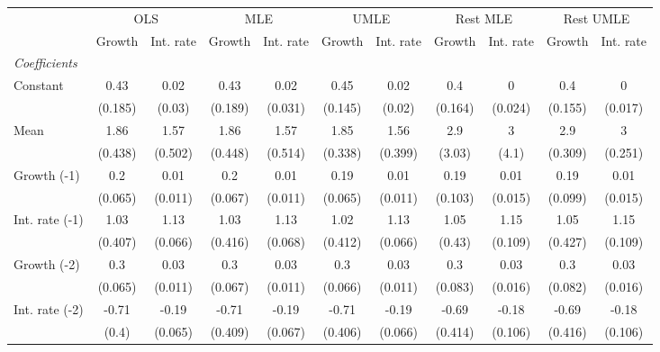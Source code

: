 \begin{table}[htbp] 
	\centering 
	\begin{tabular}{@{\extracolsep{4pt}}lcccccccccc@{}}		\hline\hline
		 		 & \multicolumn{2}{c}{OLS} &\multicolumn{2}{c}{MLE} &\multicolumn{2}{c}{UMLE} &\multicolumn{2}{c}{Rest MLE} &\multicolumn{2}{c}{Rest UMLE} \\ 
 		 & Growth 	 & Int. rate 	 & Growth 	 & Int. rate 	 & Growth 	 & Int. rate 	 & Growth 	 & Int. rate 	 & Growth 	 & Int. rate\\\cline{2-3}\cline{4-5}\cline{6-7}\cline{8-9}\cline{10-11}
\rule{0pt}{4ex} 
 \emph{Coefficients} 	  		 & 		 & 		 & 		 & 		 & 		 & 		 & 		 & 		 & 		 &\\ 
\quad Constant 	 & 0.43 	 & 0.02 	 & 0.43 	 & 0.02 	 & 0.45 	 & 0.02 	 & 0.4 	 & 0 	 & 0.4 	 & 0	 \\ 
 		 & (0.185) 	 & (0.03) 	 & (0.189) 	 & (0.031) 	 & (0.145) 	 & (0.02) 	 & (0.164) 	 & (0.024) 	 & (0.155) 	 & (0.017) 	 \\ 
\quad Mean 	 & 1.86 	 & 1.57 	 & 1.86 	 & 1.57 	 & 1.85 	 & 1.56 	 & 2.9 	 & 3 	 & 2.9 	 & 3	 \\ 
 		 & (0.438) 	 & (0.502) 	 & (0.448) 	 & (0.514) 	 & (0.338) 	 & (0.399) 	 & (3.03) 	 & (4.1) 	 & (0.309) 	 & (0.251) 	 \\ 
\quad Growth (-1) 	 &0.2 	 & 0.01 	 & 0.2 	 & 0.01 	 & 0.19 	 & 0.01 	 & 0.19 	 & 0.01 	 & 0.19 	 & 0.01	 \\ 
 		 & (0.065) 	 & (0.011) 	 & (0.067) 	 & (0.011) 	 & (0.065) 	 & (0.011) 	 & (0.103) 	 & (0.015) 	 & (0.099) 	 & (0.015) 	 \\ 
\quad Int. rate (-1) 	 &1.03 	 & 1.13 	 & 1.03 	 & 1.13 	 & 1.02 	 & 1.13 	 & 1.05 	 & 1.15 	 & 1.05 	 & 1.15	 \\ 
 		 & (0.407) 	 & (0.066) 	 & (0.416) 	 & (0.068) 	 & (0.412) 	 & (0.066) 	 & (0.43) 	 & (0.109) 	 & (0.427) 	 & (0.109) 	 \\ 
\quad Growth (-2) 	 &0.3 	 & 0.03 	 & 0.3 	 & 0.03 	 & 0.3 	 & 0.03 	 & 0.3 	 & 0.03 	 & 0.3 	 & 0.03	 \\ 
 		 & (0.065) 	 & (0.011) 	 & (0.067) 	 & (0.011) 	 & (0.066) 	 & (0.011) 	 & (0.083) 	 & (0.016) 	 & (0.082) 	 & (0.016) 	 \\ 
\quad Int. rate (-2) 	 &-0.71 	 & -0.19 	 & -0.71 	 & -0.19 	 & -0.71 	 & -0.19 	 & -0.69 	 & -0.18 	 & -0.69 	 & -0.18	 \\ 
 		 & (0.4) 	 & (0.065) 	 & (0.409) 	 & (0.067) 	 & (0.406) 	 & (0.066) 	 & (0.414) 	 & (0.106) 	 & (0.416) 	 & (0.106) 	 \\ 

\end{tabular}
\end{table}
